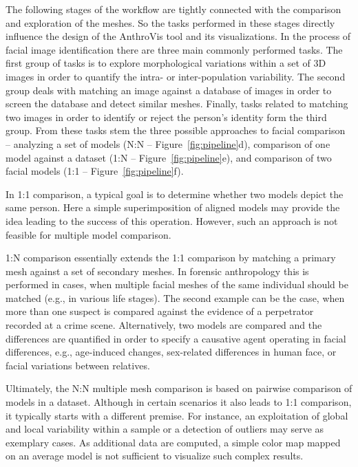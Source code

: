 \documentclass[final,5p,times]{elsarticle}
\begin{document}
The following stages of the workflow are tightly connected with the comparison and exploration of the meshes.
So the tasks performed in these stages directly influence the design of the AnthroVis tool and its visualizations.
In the process of facial image identification there are three main commonly performed tasks.
The first group of tasks is to explore morphological variations within a set of 3D images in order to quantify the intra- or inter-population variability.
The second group deals with matching an image against a database of images in order to screen the database and detect similar meshes.
Finally, tasks related to matching two images in order to identify or reject the person's identity form the third group.
From these tasks stem the three possible approaches to facial comparison -- analyzing a set of models (N:N -- Figure~\ref{fig:pipeline}d), comparison of one model against a dataset (1:N -- Figure~\ref{fig:pipeline}e), and comparison of two facial models (1:1 -- Figure~\ref{fig:pipeline}f). 

In 1:1 comparison, a typical goal is to determine whether two models depict the same person. 
Here a simple superimposition of aligned models may provide the idea leading to the success of this operation.
However, such an approach is not feasible for multiple model comparison.

1:N comparison essentially extends the 1:1 comparison by matching a primary mesh against a set of secondary meshes. 
In forensic anthropology this is performed in cases, when multiple facial meshes of the same individual should be matched (e.g., in various life stages).
The second example can be the case, when more than one suspect is compared against the evidence of a perpetrator recorded at a crime scene. 
Alternatively, two models are compared and the differences are quantified in order to specify a causative agent operating in facial differences, e.g., age-induced changes, sex-related differences in human face, or facial variations between relatives.

Ultimately, the N:N multiple mesh comparison is based on pairwise comparison of models in a dataset. 
Although in certain scenarios it also leads to 1:1 comparison, it typically starts with a different premise.
For instance, an exploitation of global and local variability within a sample or a detection of outliers may serve as exemplary cases.
As additional data are computed, a simple color map mapped on an average model is not sufficient to visualize such complex results.
\end{document}
